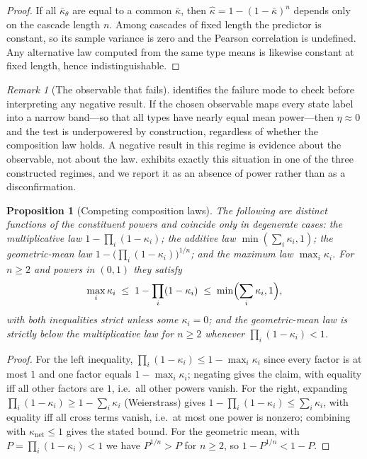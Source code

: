 \documentclass[11pt,a4paper]{article}
\theoremstyle{thmstyle}
\newtheorem{proposition}[theorem]{Proposition}
\theoremstyle{definition}
\theoremstyle{remark}
\newtheorem{remark}[theorem]{Remark}
\newcommand{\kap}{\kappa}
\begin{document}
\begin{proof}
If all $\bar\kap_\theta$ are equal to a common $\bar\kap$, then
$\hat\kap=1-(1-\bar\kap)^{n}$ depends only on the cascade length $n$. Among
cascades of fixed length the predictor is constant, so its sample variance
is zero and the Pearson correlation is undefined. Any alternative law
computed from the same type means is likewise constant at fixed length,
hence indistinguishable.
\end{proof}

\begin{remark}[The observable that fails]
\label{rem:compression}
 identifies the failure mode to check before
interpreting any negative result. If the chosen observable maps every state
label into a narrow band---so that all types have nearly equal mean
power---then $\eta\approx0$ and the test is underpowered by construction,
regardless of whether the composition law holds. A negative result in this
regime is evidence about the observable, not about the law.
 exhibits exactly this situation in one of the three
constructed regimes, and we report it as an absence of power rather than as
a disconfirmation.
\end{remark}

\begin{proposition}[Competing composition laws]
\label{prop:competitors}
The following are distinct functions of the constituent powers and coincide
only in degenerate cases: the multiplicative law
$1-\prod_i(1-\kap_i)$; the additive law $\min(\sum_i\kap_i,1)$; the
geometric-mean law $1-\bigl(\prod_i(1-\kap_i)\bigr)^{1/n}$; and the maximum
law $\max_i\kap_i$. For $n\ge2$ and powers in $(0,1)$ they satisfy
\[
\max_i\kap_i\;\le\;1-\prod_i(1-\kap_i)\;\le\;\min\Bigl(\sum_i\kap_i,1\Bigr),
\]
with both inequalities strict unless some $\kap_i=0$; and the
geometric-mean law is strictly below the multiplicative law for $n\ge2$
whenever $\prod_i(1-\kap_i)<1$.
\end{proposition}

\begin{proof}
For the left inequality, $\prod_i(1-\kap_i)\le1-\max_i\kap_i$ since every
factor is at most $1$ and one factor equals $1-\max_i\kap_i$; negating gives
the claim, with equality iff all other factors are $1$, i.e.\ all other
powers vanish. For the right, expanding $\prod_i(1-\kap_i)\ge1-\sum_i\kap_i$
(Weierstrass) gives $1-\prod_i(1-\kap_i)\le\sum_i\kap_i$, with equality iff
all cross terms vanish, i.e.\ at most one power is nonzero; combining with
$\kap_{\mathrm{net}}\le1$ gives the stated bound. For the geometric mean,
with $P=\prod_i(1-\kap_i)<1$ we have $P^{1/n}>P$ for $n\ge2$, so
$1-P^{1/n}<1-P$.
\end{proof}
\end{document}
